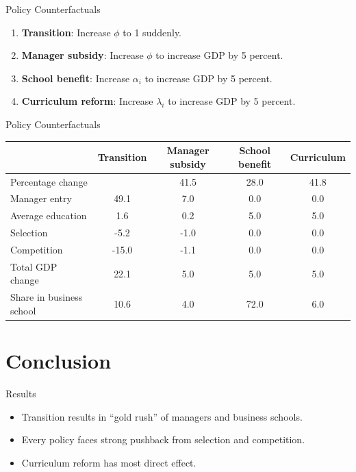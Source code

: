 \documentclass[
  ignorenonframetext,
  aspectratio=1610,
]{beamer}
\providecommand{\tightlist}{%
  \setlength{\itemsep}{0pt}\setlength{\parskip}{0pt}}
\let\oldsection\section
\renewcommand{\section}{
  \addtocounter{framenumber}{-1} %
  \oldsection
}
\begin{document}
\begin{frame}{Policy Counterfactuals}
\protect\hypertarget{policy-counterfactuals}{}
\begin{enumerate}
\tightlist
\item
  \textbf{Transition}: Increase \(\phi\) to 1 suddenly.
\item
  \textbf{Manager subsidy}: Increase \(\phi\) to increase GDP by 5
  percent.
\item
  \textbf{School benefit}: Increase \(\alpha_i\) to increase GDP by 5
  percent.
\item
  \textbf{Curriculum reform}: Increase \(\lambda_i\) to increase GDP by
  5 percent.
\end{enumerate}
\end{frame}

\begin{frame}{Policy Counterfactuals}
\protect\hypertarget{policy-counterfactuals-1}{}
\begin{tabular}{lcccc}
\toprule
{} & Transition & Manager subsidy & School benefit & Curriculum \\
\midrule
Percentage change        &                &        41.5 &       28.0 &           41.8 \\
Manager entry            &           49.1 &         7.0 &         0.0 &            0.0 \\
Average education        &            1.6 &         0.2 &         5.0 &            5.0 \\
Selection                &           -5.2 &        -1.0 &         0.0 &            0.0 \\
Competition              &          -15.0 &        -1.1 &         0.0 &            0.0 \\
\midrule
Total GDP change         &           22.1 &         5.0 &         5.0 &            5.0 \\
\midrule
Share in business school &          10.6 &       4.0 &       72.0 &          6.0 \\
\bottomrule
\end{tabular}
\end{frame}

\section{Conclusion}\label{conclusion}

\begin{frame}{Results}
\protect\hypertarget{results}{}
\begin{itemize}
\tightlist
\item
  Transition results in ``gold rush'' of managers and business schools.
\item
  Every policy faces strong pushback from selection and competition.
\item
  Curriculum reform has most direct effect.
\end{itemize}
\end{frame}
\end{document}
